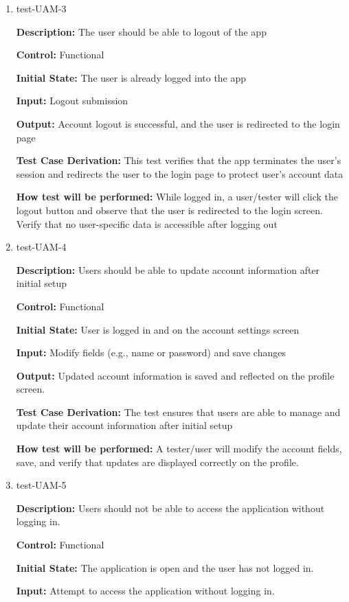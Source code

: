 \documentclass[12pt, titlepage]{article}
\begin{document}
\begin{enumerate}
\item{test-UAM-3\\}

\textbf{Description:} The user should be able to logout of the app

\textbf{Control:} Functional
					
\textbf{Initial State:} The user is already logged into the app
					
\textbf{Input:} Logout submission
					
\textbf{Output:} Account logout is successful, and the user is redirected to the login page

\textbf{Test Case Derivation:} This test verifies that the app terminates the user's session and redirects the user to the login page to protect user's account data

\textbf{How test will be performed:} While logged in, a user/tester will click the logout button and observe that the user is redirected to the login screen. Verify that no user-specific data is accessible after logging out

\item{test-UAM-4}

\textbf{Description:} Users should be able to update account information after initial setup

\textbf{Control:} Functional

\textbf{Initial State:} User is logged in and on the account settings screen

\textbf{Input:} Modify fields (e.g., name or password) and save changes

\textbf{Output:} Updated account information is saved and reflected on the profile screen.

\textbf{Test Case Derivation:} The test ensures that users are able to manage and update their account information after initial setup

\textbf{How test will be performed:} A tester/user will modify the account fields, save, and verify that updates are displayed correctly on the profile.

\item{test-UAM-5}

\textbf{Description:} Users should not be able to access the application without
logging in.

\textbf{Control:} Functional

\textbf{Initial State:} The application is open and the user has not logged in.

\textbf{Input:} Attempt to access the application without logging in.


\end{enumerate}
\end{document}
